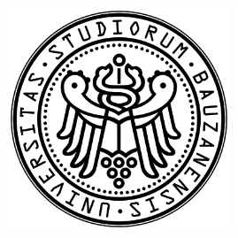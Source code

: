 \begin{titlepage}
\begin{center}
    \vspace{-3.4cm}
    \begin{flushright}
      \includegraphics[scale=0.33]{img/university-seal.png}
    \end{flushright}
  \end{center}
\end{titlepage}